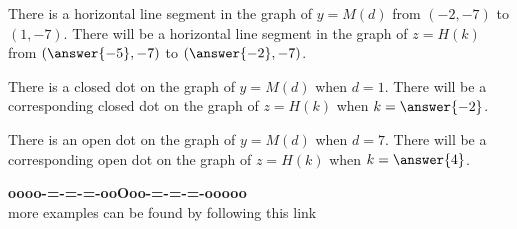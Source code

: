 \documentclass{ximera}
\begin{document}
\begin{example}
\begin{question}
\end{question}


\begin{question}

There is a horizontal line segment in the graph of $y = M(d)$ from $(-2, -7)$ to $(1, -7)$.  There will be a horizontal line segment in the graph of $z = H(k)$ from $\left(\answer{-5}, -7\right)$ to $\left(\answer{-2}, -7\right)$.

\end{question}



\begin{question}

There is a closed dot on the graph of $y= M(d)$  when $d = 1$.  There will be a corresponding closed dot on the graph of $z = H(k)$ when $k = \answer{-2}$. 


There is an open dot on the graph of $y= M(d)$  when $d = 7$.  There will be a corresponding open dot on the graph of $z = H(k)$ when $k = \answer{4}$.

\end{question}




\end{example}













































\begin{onlineOnly}
\begin{center}
\textbf{\textcolor{green!50!black}{oooo-=-=-=-ooOoo-=-=-=-ooooo}} \\

more examples can be found by following this link\\ 

\end{center}
\end{onlineOnly}
\end{document}
